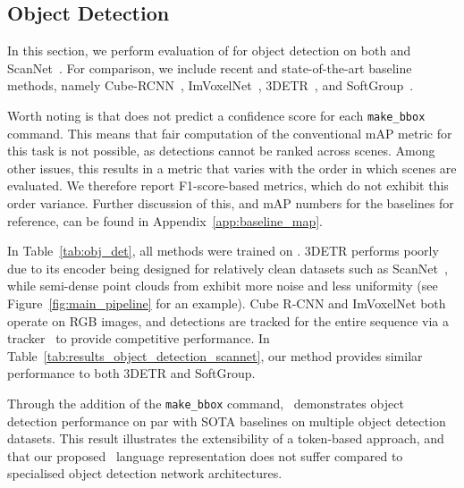 \subsection{Object Detection}
In this section, we perform evaluation of \METHOD{} for object detection on both \DatasetName{} and ScanNet~\cite{dai2017scannet}. For comparison, we include recent and state-of-the-art baseline methods, namely Cube-RCNN~\cite{brazil2023omni3d}, ImVoxelNet~\cite{rukhovich2022imvoxelnet}, 3DETR~\cite{misra2021end}, and SoftGroup~\cite{vu2022softgroup}. 

Worth noting is that \METHOD{} does not predict a confidence score for each \texttt{make\_bbox} command. This means that fair computation of the conventional mAP metric for this task is not possible, as detections cannot be ranked across scenes. Among other issues, this results in a metric that varies with the order in which scenes are evaluated. We therefore report F1-score-based metrics, which do not exhibit this order variance. Further discussion of this, and mAP numbers for the baselines for reference, can be found in 
Appendix~\ref{app:baseline_map}.



In Table~\ref{tab:obj_det}, all methods were trained on \DatasetName. 
3DETR performs poorly due to its encoder being designed for relatively clean datasets such as ScanNet~\cite{dai2017scannet}, while semi-dense point clouds from \DatasetName{} exhibit more noise and less uniformity (see Figure~\ref{fig:main_pipeline} for an example).
Cube R-CNN and ImVoxelNet both operate on RGB images, and detections are tracked for the entire sequence via a tracker~\cite{brazil2023omni3d} to provide competitive performance. 
In Table~\ref{tab:results_object_detection_scannet}, our method provides similar performance to both 3DETR and SoftGroup.

Through the addition of the \texttt{make\_bbox} command, \METHOD~demonstrates object detection performance on par with SOTA baselines on multiple object detection datasets. 
This result illustrates the extensibility of a token-based approach, and that our proposed \METHOD~language representation does not suffer compared to specialised object detection network architectures.

